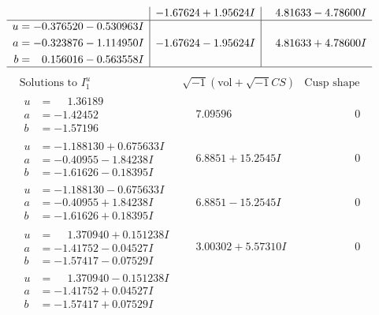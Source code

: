 \documentclass[1p]{elsarticle_modified}
\theoremstyle{definition}
\newcommand{\I}{\sqrt{-1}}
\begin{document}
$$\begin{array}{c|c|c}
 & -1.67624 + 1.95624 I & \phantom{-}4.81633 - 4.78600 I \\ \hline\begin{aligned}
u &= -0.376520 - 0.530963 I \\
a &= -0.323876 - 1.114950 I \\
b &= \phantom{-}0.156016 - 0.563558 I\end{aligned}
 & -1.67624 - 1.95624 I & \phantom{-}4.81633 + 4.78600 I\\
 \hline 
 \end{array}$$\newpage$$\begin{array}{c|c|c}  
\text{Solutions to }I^u_{1}& \I (\text{vol} + \sqrt{-1}CS) & \text{Cusp shape}\\
 \hline 
\begin{aligned}
u &= \phantom{-}1.36189\phantom{ +0.000000I} \\
a &= -1.42452\phantom{ +0.000000I} \\
b &= -1.57196\phantom{ +0.000000I}\end{aligned}
 & \phantom{-}7.09596\phantom{ +0.000000I} & \phantom{-0.000000 } 0 \\ \hline\begin{aligned}
u &= -1.188130 + 0.675633 I \\
a &= -0.40955 - 1.84238 I \\
b &= -1.61626 - 0.18395 I\end{aligned}
 & \phantom{-}6.8851 + 15.2545 I & \phantom{-0.000000 } 0 \\ \hline\begin{aligned}
u &= -1.188130 - 0.675633 I \\
a &= -0.40955 + 1.84238 I \\
b &= -1.61626 + 0.18395 I\end{aligned}
 & \phantom{-}6.8851 - 15.2545 I & \phantom{-0.000000 } 0 \\ \hline\begin{aligned}
u &= \phantom{-}1.370940 + 0.151238 I \\
a &= -1.41752 - 0.04527 I \\
b &= -1.57417 - 0.07529 I\end{aligned}
 & \phantom{-}3.00302 + 5.57310 I & \phantom{-0.000000 } 0 \\ \hline\begin{aligned}
u &= \phantom{-}1.370940 - 0.151238 I \\
a &= -1.41752 + 0.04527 I \\
b &= -1.57417 + 0.07529 I\end{aligned}

\end{array}$$
\end{document}
